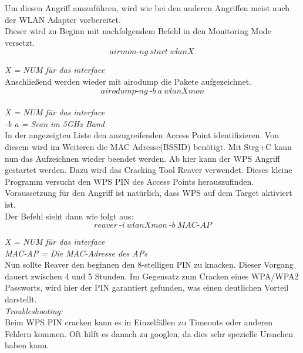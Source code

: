 Um diesen Angriff auszuführen, wird wie bei den anderen Angriffen meist auch der WLAN Adapter vorbereitet.\\

Dieser wird zu Beginn mit nachfolgendem Befehl in den Monitoring Mode versetzt.\\

$$airmon\text{-}ng~start~wlanX~$$

\textit{X = NUM für das interface}\\


Anschließend werden wieder mit airodump die Pakete aufgezeichnet. \\

$$airodump\text{-}ng~\text{-}b~a~wlanXmon$$\\
	 
	\textit{X = NUM für das interface}\\
	\textit{-b a = Scan im 5GHz Band}\\	

In der angezeigten Liste den anzugreifenden Access Point identifizieren. Von diesem wird im Weiteren die MAC Adresse(BSSID) benötigt.
Mit Strg+C kann nun das Aufzeichnen wieder beendet werden. Ab hier kann der WPS Angriff gestartet werden. Dazu wird das Cracking Tool Reaver verwendet. Dieses kleine Programm versucht den WPS PIN des Access Points herauszufinden. Voraussetzung für den Angriff ist natürlich, dass WPS auf dem Target aktiviert ist. \\

Der Befehl sieht dann wie folgt aus:\\


$$reaver~\text{-}i~wlanXmon~\text{-}b~MAC\text{-}AP$$

\textit{X = NUM für das interface}\\ 
\textit{MAC-AP = Die MAC-Adresse des APs}\\ 

Nun sollte Reaver den beginnen den 8-stelligen PIN zu knacken. Dieser Vorgang dauert zwischen 4 und 5 Stunden. Im Gegensatz zum Cracken eines WPA/WPA2 Passworts, wird hier der PIN garantiert gefunden, was einen deutlichen Vorteil darstellt. \\

\textit{Troubleshooting:}\\

Beim WPS PIN cracken kann es in Einzelfällen zu Timeouts oder anderen Fehlern kommen. Oft hilft es danach zu googlen, da dies sehr spezielle Ursachen haben kann. \\

